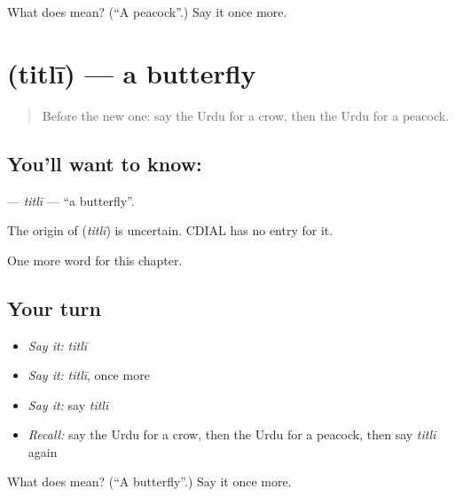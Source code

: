 \begin{tcolorbox}[breakable,colback=teal!4,colframe=teal!35!black,title={Before you move on}]
What does  mean? (\textquotedblleft{}A peacock\textquotedblright{}.) Say it once more.
\end{tcolorbox}
\section[\texorpdfstring{\ur{تتلی} (titlī)}{تتلی (titlī)}]{ (titlī) — a butterfly}

\label{lesson:UR-C126-titli}



\begin{quote}
Before the new one: say the Urdu for a crow, then the Urdu for a peacock.
\end{quote}

\subsection*{You'll want to know: }
\textbf{} — \emph{titlī} — \textquotedblleft{}a butterfly\textquotedblright{}.

\begin{cousinweb}
The origin of \textbf{} (\emph{titlī}) is uncertain. CDIAL has no entry for it.
\end{cousinweb}

\begin{grammarlens}[title={What you've built}]
One more word for this chapter.
\end{grammarlens}

\subsection*{Your turn}
\begin{itemize}
\raggedright
  \item \emph{Say it:} \emph{titlī}
  \item \emph{Say it:} \emph{titlī}, once more
  \item \emph{Say it:} say \emph{titlī}
  \item \emph{Recall:} say the Urdu for a crow, then the Urdu for a peacock, then say \emph{titlī} again
\end{itemize}

\begin{tcolorbox}[breakable,colback=teal!4,colframe=teal!35!black,title={Before you move on}]
What does  mean? (\textquotedblleft{}A butterfly\textquotedblright{}.) Say it once more.
\end{tcolorbox}

